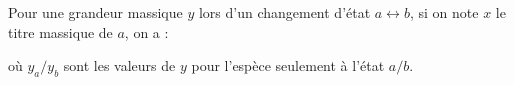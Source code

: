 ﻿\documentclass[a4paper]{article}
\begin{document}
\pagestyle{fancy}
\fancyhf{}
\setlength{\headheight}{15pt}

\begin{center}
	\large{}
\end{center}


Pour une grandeur massique \(y\) lors d'un changement d'état \(a\leftrightarrow b\), si on note \( x \) le titre massique de \(a\), on a :
\begin{center}\end{center} où \(y_a/y_b\) sont les valeurs de \(y\) pour l'espèce seulement à l'état \(a/b\).
\end{document}
